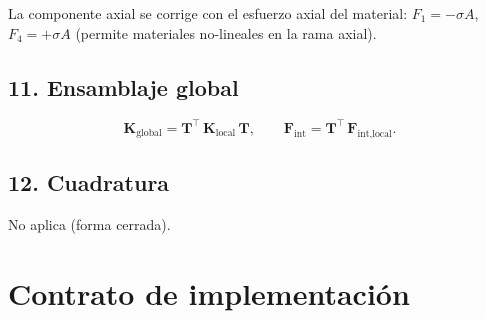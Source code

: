 \documentclass[11pt,letterpaper,oneside]{report}
\begin{document}
La componente axial se corrige con el esfuerzo axial del material: $F_1 = -\sigma A$, $F_4 = +\sigma A$ (permite materiales no-lineales en la rama axial).

\subsection{11. Ensamblaje global}
\[
\mathbf K_{\text{global}} = \mathbf T^\top\,\mathbf K_{\text{local}}\,\mathbf T, \qquad \mathbf F_{\text{int}} = \mathbf T^\top\,\mathbf F_{\text{int,local}}.
\]

\subsection{12. Cuadratura}
No aplica (forma cerrada).


\section{Contrato de implementación}
\end{document}
